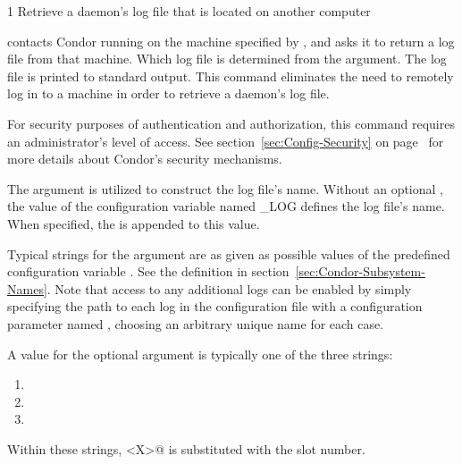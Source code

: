 \begin{ManPage}{\label{man-condor-fetchlog}}{1}
{Retrieve a daemon's log file that is located on another computer}

\Synopsis 
{}
\ToolArgsBase



\Description 

 contacts Condor running on the machine specified by
, and asks it to return a log file from that
machine.  Which log file is determined from
the  argument.
The log file is printed to standard output.
This command eliminates the need to remotely log in to a
machine in order to retrieve a daemon's log file.

For security purposes of authentication and authorization, 
this command requires an administrator's level of access.
See section~\ref{sec:Config-Security} 
on page~\pageref{sec:Config-Security} for more details about Condor's
security mechanisms.

The  argument is utilized to construct
the log file's name.
Without an optional ,
the value of the configuration variable named \_LOG 
defines the log file's name.
When specified, the  is appended to this value.

Typical strings for the argument  are as given as
possible values of the predefined configuration
variable .
See the definition in
section~\ref{sec:Condor-Subsystem-Names}.  Note that access to any
additional logs can be enabled by simply specifying the path to
each log in the configuration file with a configuration parameter named
, choosing an arbitrary unique name for each case.

A value for the optional  argument is typically one of
the three strings:
\begin{enumerate}
\item{}
\item{}
\item{}
\end{enumerate}
Within these strings, \verb@<X>@ is substituted with the slot number.
 

\end{ManPage}
